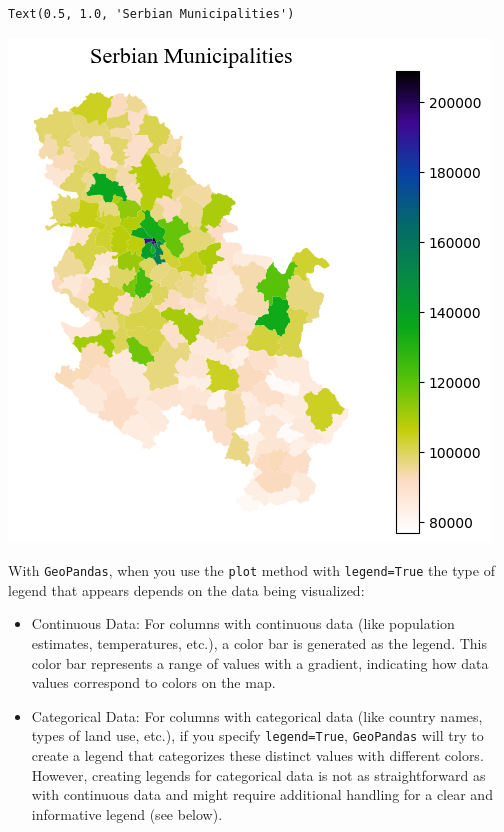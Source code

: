 \documentclass[
  letterpaper,
  DIV=11,
  numbers=noendperiod]{scrreprt}
\providecommand{\tightlist}{%
  \setlength{\itemsep}{0pt}\setlength{\parskip}{0pt}}\usepackage{longtable,booktabs,array}
\begin{document}
\begin{verbatim}
Text(0.5, 1.0, 'Serbian Municipalities')
\end{verbatim}

\includegraphics{labs/w02_maps_files/figure-pdf/cell-33-output-2.png}

With \texttt{GeoPandas}, when you use the \texttt{plot} method with
\texttt{legend=True} the type of legend that appears depends on the data
being visualized:

\begin{itemize}
\tightlist
\item
  Continuous Data: For columns with continuous data (like population
  estimates, temperatures, etc.), a color bar is generated as the
  legend. This color bar represents a range of values with a gradient,
  indicating how data values correspond to colors on the map.
\item
  Categorical Data: For columns with categorical data (like country
  names, types of land use, etc.), if you specify \texttt{legend=True},
  \texttt{GeoPandas} will try to create a legend that categorizes these
  distinct values with different colors. However, creating legends for
  categorical data is not as straightforward as with continuous data and
  might require additional handling for a clear and informative legend
  (see below).
\end{itemize}
\end{document}
